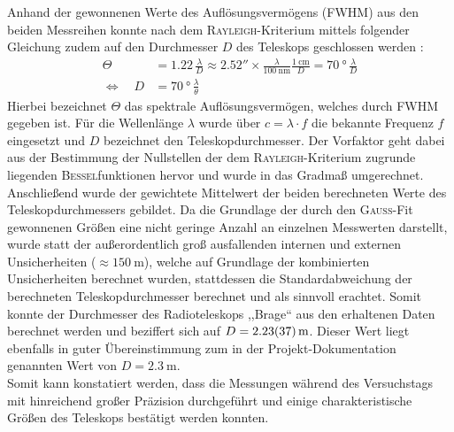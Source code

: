     Anhand der gewonnenen Werte des Auflösungsvermögens (FWHM) aus den beiden Messreihen konnte nach dem \textsc{Rayleigh}-Kriterium mittels folgender Gleichung zudem auf den Durchmesser $D$ des Teleskops geschlossen werden \cite{Karttunen2013}:
    \begin{align}
        \Theta &= 1.22 \, \frac{\lambda}{D} \approx \ang{;;2.52} \times \frac{\lambda}{\SI{100}{\nano \metre}} \frac{\SI{1}{\centi \metre}}{D} = \SI{70}{\degree} \, \frac{\lambda}{D}\\
        \Leftrightarrow \quad D &= \SI{70}{\degree} \, \frac{\lambda}{\theta}
    \end{align}
    Hierbei bezeichnet $\Theta$ das spektrale Auflösungsvermögen, welches durch FWHM gegeben ist. Für die Wellenlänge $\lambda$ wurde über $c = \lambda \cdot f$ die bekannte Frequenz $f$ eingesetzt und $D$ bezeichnet den Teleskopdurchmesser.
    Der Vorfaktor geht dabei aus der Bestimmung der Nullstellen der dem \textsc{Rayleigh}-Kriterium zugrunde liegenden \textsc{Bessel}funktionen hervor und wurde in das Gradmaß umgerechnet.
    Anschließend wurde der gewichtete Mittelwert der beiden berechneten Werte des Teleskopdurchmessers gebildet. Da die Grundlage der durch den \textsc{Gauß}-Fit gewonnenen Größen eine nicht geringe Anzahl an einzelnen Messwerten darstellt, wurde statt der außerordentlich groß ausfallenden internen und externen Unsicherheiten ($\approx \SI{150}{\metre}$), welche auf Grundlage der kombinierten Unsicherheiten berechnet wurden, stattdessen die Standardabweichung der berechneten Teleskopdurchmesser berechnet und als sinnvoll erachtet. Somit konnte der Durchmesser des Radioteleskops ,,Brage`` aus den erhaltenen Daten berechnet werden und beziffert sich auf $D = \SI{2.23 \pm 0.37}{\metre}$. Dieser Wert liegt ebenfalls in guter Übereinstimmung zum in der Projekt-Dokumentation \cite{Usermanual} genannten Wert von $D = \SI{2.3}{\metre}$. \\    
    
    Somit kann konstatiert werden, dass die Messungen während des Versuchstags mit hinreichend großer Präzision durchgeführt und einige charakteristische Größen des Teleskops bestätigt werden konnten.